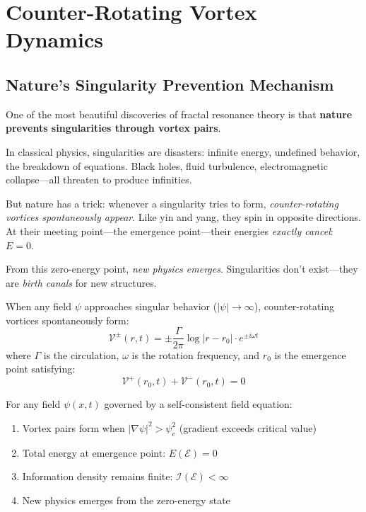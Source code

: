\section{Counter-Rotating Vortex Dynamics}

\subsection{Nature's Singularity Prevention Mechanism}

One of the most beautiful discoveries of fractal resonance theory is that \textbf{nature prevents singularities through vortex pairs}.

\begin{intuitive}
In classical physics, singularities are disasters: infinite energy, undefined behavior, the breakdown of equations. Black holes, fluid turbulence, electromagnetic collapse---all threaten to produce infinities.

But nature has a trick: whenever a singularity tries to form, \textit{counter-rotating vortices spontaneously appear}. Like yin and yang, they spin in opposite directions. At their meeting point---the emergence point---their energies \textit{exactly cancel}: $E = 0$.

From this zero-energy point, \textit{new physics emerges}. Singularities don't exist---they are \textit{birth canals} for new structures.
\end{intuitive}

\begin{defn}\label{def:vortex-pair}
When any field $\psi$ approaches singular behavior ($|\psi| \to \infty$), counter-rotating vortices spontaneously form:
\begin{equation}
\mathcal{V}^\pm(r, t) = \pm \frac{\Gamma}{2\pi} \log|r - r_0| \cdot e^{\pm i\omega t}
\end{equation}
where $\Gamma$ is the circulation, $\omega$ is the rotation frequency, and $r_0$ is the emergence point satisfying:
\begin{equation}
\mathcal{V}^+(r_0, t) + \mathcal{V}^-(r_0, t) = 0
\end{equation}
\end{defn}

\begin{thm}\label{thm:no-singularity}
For any field $\psi(x,t)$ governed by a self-consistent field equation:
\begin{enumerate}
\item Vortex pairs form when $|\nabla\psi|^2 > \psi_c^2$ (gradient exceeds critical value)
\item Total energy at emergence point: $E(\mathcal{E}) = 0$
\item Information density remains finite: $\mathcal{I}(\mathcal{E}) < \infty$
\item New physics emerges from the zero-energy state
\end{enumerate}
\end{thm}

